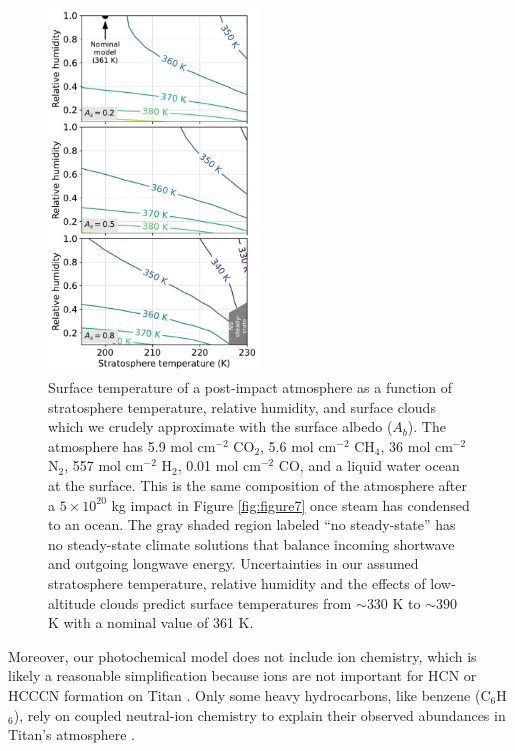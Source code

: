 \begin{figure}
  \centering
  \includegraphics[width=0.5\textwidth]{tex/5impacts/figures/Figure8.pdf}
  \caption{Surface temperature of a post-impact atmosphere as a function of stratosphere temperature, relative humidity, and surface clouds which we crudely approximate with the surface albedo ($A_b$). The atmosphere has 5.9 mol cm$^{-2}$ CO$_2$, 5.6 mol cm$^{-2}$ CH$_4$, 36 mol cm$^{-2}$ N$_2$, 557 mol cm$^{-2}$ H$_2$, 0.01 mol cm$^{-2}$ CO, and a liquid water ocean at the surface. This is the same composition of the atmosphere after a $5 \times 10^{20}$ kg impact in Figure \ref{fig:figure7} once steam has condensed to an ocean. The gray shaded region labeled ``no steady-state'' has no steady-state climate solutions that balance incoming shortwave and outgoing longwave energy. Uncertainties in our assumed stratosphere temperature, relative humidity and the effects of low-altitude clouds predict surface temperatures from $\sim 330$ K to $\sim 390$ K with a nominal value of 361 K.}
  \label{fig:figure8}
\end{figure}

Moreover, our photochemical model does not include ion chemistry, which is likely a reasonable simplification because ions are not important for HCN or HCCCN formation on Titan \citep{Loison_2015}. Only some heavy hydrocarbons, like benzene (C$_6$H$_6$), rely on coupled neutral-ion chemistry to explain their observed abundances in Titan's atmosphere \citep{Horst_2017}.

